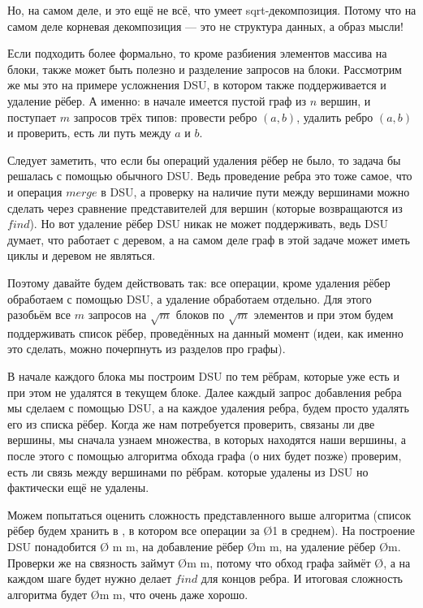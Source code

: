 
Но, на самом деле, и это ещё не всё, что умеет sqrt-декомпозиция. Потому что на самом деле корневая декомпозиция — это не структура данных, а образ мысли!

Если подходить более формально, то кроме разбиения элементов массива на блоки, также может быть полезно и разделение запросов на блоки. Рассмотрим же мы это на примере усложнения DSU, в котором также поддерживается и удаление рёбер. А именно: в начале имеется пустой граф из $n$ вершин, и поступает $m$ запросов трёх типов: провести ребро $(a, b)$, удалить ребро $(a, b)$ и проверить, есть ли путь между $a$ и $b$.

Следует заметить, что если бы операций удаления рёбер не было, то задача бы решалась с помощью обычного DSU. Ведь проведение ребра это тоже самое, что и операция $merge$ в DSU, а проверку на наличие пути между вершинами можно сделать через сравнение представителей для вершин (которые возвращаются из $find$). Но вот удаление рёбер DSU никак не может поддерживать, ведь DSU думает, что работает с деревом, а на самом деле граф в этой задаче может иметь циклы и деревом не являться.

Поэтому давайте будем действовать так: все операции, кроме удаления рёбер обработаем с помощью DSU, а удаление обработаем отдельно. Для этого разобьём все $m$ запросов на $\sqrt{m}$ блоков по $\sqrt{m}$ элементов и при этом будем поддерживать список рёбер, проведённых на данный момент (идеи, как именно это сделать, можно почерпнуть из разделов про графы).

В начале каждого блока мы построим DSU по тем рёбрам, которые уже есть и при этом не удалятся в текущем блоке. Далее каждый запрос добавления ребра мы сделаем с помощью DSU, а на каждое удаления ребра, будем просто удалять его из списка рёбер. Когда же нам потребуется проверить, связаны ли две вершины, мы сначала узнаем множества, в которых находятся наши вершины, а после этого с помощью алгоритма обхода графа (о них будет позже) проверим, есть ли связь между вершинами по рёбрам. которые удалены из DSU но фактически ещё не удалены.

Можем попытаться оценить сложность представленного выше алгоритма (список рёбер будем хранить в , в котором все операции за \O{1} в среднем). На построение DSU понадобится \O{ \cdot m \ac{m}}, на добавление рёбер \O{m \ac{m}}, на удаление рёбер \O{m}. Проверки же на связность займут \O{m  \ac{m}}, потому что обход графа займёт \O{}, а на каждом шаге будет нужно делает $find$ для концов ребра. И итоговая сложность алгоритма будет \O{m  \ac{m}}, что очень даже хорошо.
